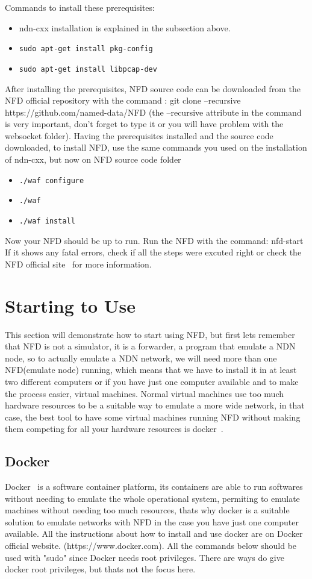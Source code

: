\documentclass[11pt,conference]{./IEEEtran}
\begin{document}
	Commands to install these prerequisites:
	\begin{itemize}
		\item ndn-cxx installation is explained in the subsection above.
		
		\item \texttt{sudo apt-get install pkg-config}
		
		\item \texttt{sudo apt-get install libpcap-dev}
	\end{itemize}
After installing the prerequisites, NFD source code can be downloaded from the NFD official repository with the command : git clone --recursive https://github.com/named-data/NFD (the --recursive attribute in the command is very important, don't forget to type it or you will have problem with the websocket folder).
Having the prerequisites installed and the source code downloaded, to install NFD, use the same commands you used on the installation of ndn-cxx, but now on NFD source code folder
\begin{itemize}
 \item \texttt{./waf configure} 
 \item \texttt{./waf}
 \item \texttt{./waf install}
\end{itemize}
Now your NFD should be up to run. Run the NFD with the command: nfd-start
If it shows any fatal errors, check if all the steps were excuted right or check the NFD official site~\cite{NFD} for more information. 

\section{Starting to Use}
This section will demonstrate how to start using NFD, but first lets remember that NFD is not a simulator, it is a forwarder, a program that emulate a NDN node, so to actually emulate a NDN network, we will need more than one NFD(emulate node) running, which means that we have to install it in at least two different computers or if you have just one computer available and to make the process easier, virtual machines.
Normal virtual machines use too much hardware resources to be a suitable way to emulate a more wide network, in that case, the best tool to have some virtual machines running NFD without making them competing for all your hardware resources is docker~\cite{docker}. 

\subsection{Docker}
Docker~\cite{docker} is a software container platform, its containers are able to run softwares without needing to emulate the whole operational system, permiting to emulate machines without needing too much resources, thats why docker is a suitable solution to emulate networks with NFD in the case you have just one computer available.
All the instructions about how to install and use docker are on Docker official website. (https://www.docker.com).
All the commands below should be used with "sudo" since Docker needs root privileges. There are ways do give docker root privileges, but thats not the focus here.
\end{document}
